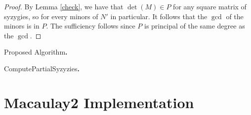 \documentclass[fleqn,reqno]{amsart}
\numberwithin{first}{chapter}
\begin{document}
\begin{proof}
By Lemma \ref{check}, we have that $\det(M)\in P$ for any square matrix of syzygies,
so for every minors of $N'$ in particular.
It follows that the $\gcd$ of the minors is in $P$.
The sufficiency follows since $P$ is principal of the same degree as the $\gcd$.
\end{proof}

\begin{absolutelynopagebreak}
\begin{algorithm}{\sc Proposed Algorithm}{\bf.}
\label{algo:proposed}
\begin{algorithmic}
\EndWhile
{}
\end{algorithmic}
\end{algorithm}
\end{absolutelynopagebreak}

\begin{absolutelynopagebreak}
\begin{algorithm}{\sc ComputePartialSyzyzies}{\bf.}
\label{algo:compute-Ni}
\begin{algorithmic}
\EndFor
{}
\end{algorithmic}
\end{algorithm}
\end{absolutelynopagebreak}



\section{Macaulay2 Implementation}
\label{sec:implementation}
\end{document}

